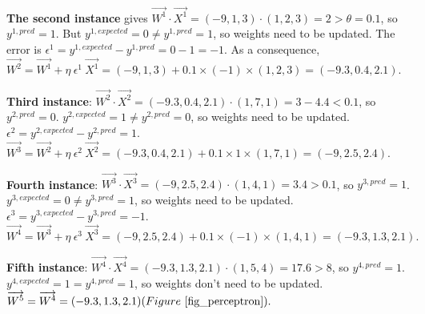 \begin{tcolorbox}[nofloat, colback=white,colframe=black, colbacktitle=white, coltitle=black, breakable, title=\textbf{Example 1} Athlete classification with a perceptron, label=example1]
      \textbf{The second instance} gives \(\overrightarrow{W^1} \cdot \overrightarrow{X^1} = (-9, 1, 3) \cdot (1,2,3) = 2 > \theta = 0.1\), so $y^{1, pred} = 1$. \newline
      But \(y^{1, expected} = 0 \neq y^{1, pred} = 1\), so weights need to be updated.\newline
      The error is \(\epsilon^1 = y^{1,expected} - y^{1,pred} = 0-1 = -1\).\newline
      As a consequence, \(\overrightarrow{W^2} = \overrightarrow{W^1} + \eta \ \epsilon^1 \ \overrightarrow{X^1} = (-9, 1, 3)  + 0.1 \times (-1) \times (1,2,3) = (-9.3,0.4,2.1).\)\newline
      
      \textbf{Third instance}: \(\overrightarrow{W^2} \cdot \overrightarrow{X^2} = (-9.3,0.4,2.1) \cdot (1,7,1) = 3-4.4 < 0.1\), so $y^{2, pred} = 0$. \newline
      \(y^{2, expected} = 1 \neq y^{2, pred} = 0\), so weights need to be updated.\newline 
      \(\epsilon^2 = y^{2,expected} - y^{2,pred} = 1\).\newline
      \(\overrightarrow{W^3} = \overrightarrow{W^2} + \eta \ \epsilon^2 \ \overrightarrow{X^2} = (-9.3,0.4,2.1) + 0.1 \times 1 \times (1,7,1) = (-9,2.5,2.4).\)\newline
      
      \textbf{Fourth instance}: \(\overrightarrow{W^3} \cdot \overrightarrow{X^3} = (-9,2.5,2.4) \cdot (1,4,1) = 3.4 > 0.1\), so $y^{3, pred} = 1$. \newline
      \(y^{3, expected} = 0 \neq y^{3, pred} = 1\), so weights need to be updated.\newline
      \(\epsilon^3 = y^{3,expected} - y^{3,pred} = -1\).\newline
      \(\overrightarrow{W^4} = \overrightarrow{W^3} + \eta \ \epsilon^3 \ \overrightarrow{X^3} = (-9,2.5,2.4) + 0.1 \times (-1) \times (1,4,1) = (-9.3,1.3,2.1).\)\newline
      
      \textbf{Fifth instance}: \(\overrightarrow{W^4} \cdot \overrightarrow{X^4} = (-9.3,1.3,2.1) \cdot (1, 5, 4) = 17.6 > 8\), so $y^{4, pred} = 1$. \newline
      \(y^{4, expected} = 1 = y^{4, pred} = 1\), so weights don't need to be updated.\newline
      \(\overrightarrow{W^5} = \overrightarrow{W^4} = (-9.3,1.3,2.1) (Figure~\ref{fig_perceptron}). \)\newline


\end{tcolorbox}
